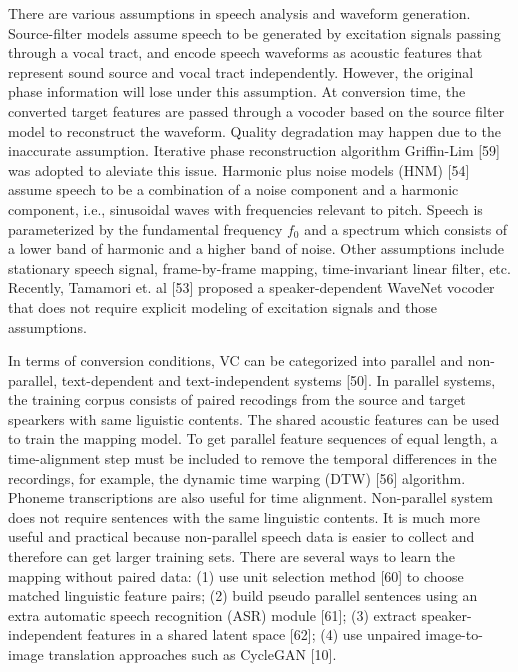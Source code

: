 \documentclass{article}
\begin{document}
There are various assumptions in speech analysis and waveform generation. Source-filter models assume speech to be generated by excitation signals passing through a vocal tract, and encode speech waveforms as acoustic features that represent sound source and vocal tract independently. However, the original phase information will lose under this assumption. At conversion time, the converted target features are passed through a vocoder based on the source filter model to reconstruct the waveform. Quality degradation may happen due to the inaccurate assumption. Iterative phase reconstruction algorithm Griffin-Lim [59] was adopted to aleviate this issue. Harmonic plus noise models (HNM) [54] assume speech to be a combination of a noise component and a harmonic component, i.e., sinusoidal waves with frequencies relevant to pitch. Speech is parameterized by the fundamental frequency $f_0$ and a spectrum which consists of a lower band of harmonic and a higher band of noise. Other assumptions include
stationary speech signal, %
frame-by-frame mapping, %
time-invariant linear filter, etc. Recently, Tamamori et. al [53] proposed a speaker-dependent WaveNet vocoder that does not require explicit modeling of excitation signals and those assumptions.


In terms of conversion conditions, VC can be categorized into parallel and non-parallel, text-dependent and text-independent systems [50]. In parallel systems, the training corpus consists of paired recodings from the source and target spearkers with same liguistic contents. The shared acoustic features can be used to train the mapping model. To get parallel feature sequences of equal length, a time-alignment step must be included to remove the temporal differences in the recordings, for example, the dynamic time warping (DTW) [56] algorithm. Phoneme transcriptions are also useful for time alignment. Non-parallel system does not require sentences with the same linguistic contents. It is much more useful and practical because non-parallel speech data is easier to collect and therefore can get larger training sets. There are several ways to learn the mapping without paired data: (1) use unit selection method [60] to choose matched linguistic feature pairs; (2) build pseudo parallel sentences using an extra automatic speech recognition (ASR) module [61]; (3) extract speaker-independent features in a shared latent space [62]; (4) use unpaired image-to-image translation approaches such as CycleGAN [10].
\end{document}
